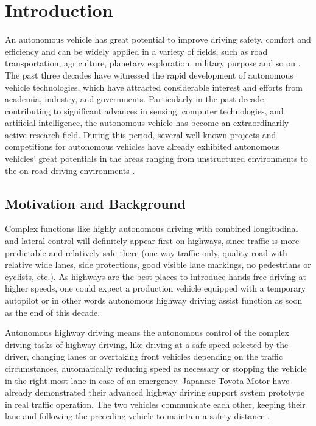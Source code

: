 \chapter{Introduction}


An autonomous vehicle has great potential to improve driving safety, comfort and efficiency and can be widely applied in a variety of fields, such as road transportation, agriculture, planetary exploration, military purpose and so on \cite {WANG2015727}. The past three decades have witnessed the rapid development of autonomous vehicle technologies, which have attracted considerable interest and efforts from academia, industry, and governments. Particularly in the past decade, contributing to significant advances in sensing, computer technologies, and artificial intelligence, the autonomous vehicle has become an extraordinarily active research field. During this period, several well-known projects and competitions for autonomous vehicles have already exhibited autonomous vehicles' great potentials in the areas ranging from unstructured environments to the on-road driving environments \cite{AutonomousStructured} \cite{DrivingUrban2008}.

\section{Motivation and Background}


Complex functions like highly autonomous driving with combined longitudinal and lateral control will definitely appear first on highways, since traffic is more predictable and relatively safe there (one-way traffic only, quality road with relative wide lanes, side protections, good visible lane markings, no pedestrians or cyclists, etc.). As highways are the best places to introduce hands-free driving at higher speeds, one could expect a production vehicle equipped with a temporary autopilot or in other words autonomous highway driving assist function as soon as the end of this decade. 

Autonomous highway driving means the autonomous control of the complex driving tasks of highway driving, like driving at a safe speed selected by the driver, changing lanes or overtaking front vehicles depending on the traffic circumstances, automatically reducing speed as necessary or stopping the vehicle in the right most lane in case of an emergency. Japanese Toyota Motor have already demonstrated their advanced highway driving support system prototype in real traffic operation. The two vehicles  communicate each other, keeping their lane and following the preceding vehicle to maintain a safety distance \cite{Nissan2013}.

